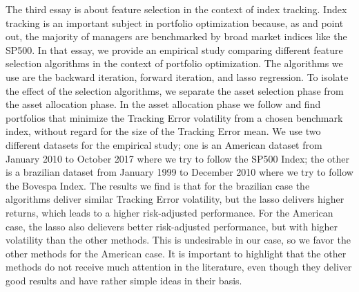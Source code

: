 \documentclass[12pt,oneside,a4paper]{memoir}
\begin{document}
The third essay is about feature selection in the context of index tracking.
Index tracking is an important subject in portfolio optimization because, as  and  point out, the majority of managers are benchmarked by broad market indices like the SP500.
In that essay, we provide an empirical study comparing different feature selection algorithms in the context of portfolio optimization.
The algorithms we use are the backward iteration, forward iteration, and lasso regression.
To isolate the effect of the selection algorithms, we separate the asset selection phase from the asset allocation phase.
In the asset allocation phase we follow  and find portfolios that minimize the Tracking Error volatility from a chosen benchmark index, without regard for the size of the Tracking Error mean.
We use two different datasets for the empirical study; one is an American dataset from January 2010 to October 2017 where we try to follow the SP500 Index; the other is a brazilian dataset from January 1999 to December 2010 where we try to follow the Bovespa Index.
The results we find is that for the brazilian case the algorithms deliver similar Tracking Error volatility, but the lasso delivers higher returns, which leads to a higher risk-adjusted performance.
For the American case, the lasso also delievers better risk-adjusted performance, but with higher volatility than the other methods.
This is undesirable in our case, so we favor the other methods for the American case.
It is important to highlight that the other methods do not receive much attention in the literature, even though they deliver good results and have rather simple ideas in their basis.

\postextual


\renewcommand\bibname{REFERENCES}


\end{document}

